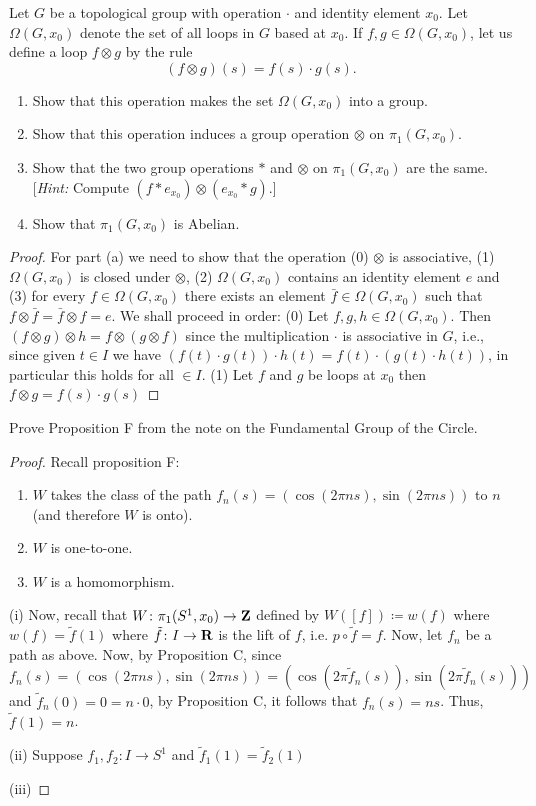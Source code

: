 \begin{problem}
Let $G$ be a topological group with operation $\cdot$ and identity element
$x_0$. Let $\Omega(G,x_0)$ denote the set of all loops in $G$ based at
$x_0$. If $f,g\in\Omega(G,x_0)$, let us define a loop $f\otimes g$ by the
rule
\[
(f\otimes g)(s)=f(s)\cdot g(s).
\]
\begin{enumerate}[label=(\alph*)]
\item Show that this operation makes the set $\Omega(G,x_0)$ into a group.
\item Show that this operation induces a group operation $\otimes$ on
  $\pi_1(G,x_0)$.
\item Show that the two group operations $*$ and $\otimes$ on
  $\pi_1(G,x_0)$ are the same. [\emph{Hint:} Compute
  $(f*e_{x_0})\otimes(e_{x_0}*g)$.]
\item Show that $\pi_1(G,x_0)$ is Abelian.
\end{enumerate}
\end{problem}
\begin{proof}
For part (a) we need to show that the operation (0) $\otimes$ is associative,
(1) $\Omega(G,x_0)$ is closed under $\otimes$, (2) $\Omega(G,x_0)$ contains
an identity element $e$ and (3) for every $f\in\Omega(G,x_0)$ there
exists an element $\bar f\in\Omega(G,x_0)$ such that $f\otimes\bar f=\bar
f\otimes f=e$. We shall proceed in order: (0) Let
$f,g,h\in\Omega(G,x_0)$. Then $(f\otimes g)\otimes h=f\otimes(g\otimes f)$
since the multiplication $\cdot$ is associative in $G$, i.e., since given
$t\in I$ we have $(f(t)\cdot g(t))\cdot h(t)=f(t)\cdot (g(t)\cdot h(t))$,
in particular this holds for all $\in I$. (1) Let $f$ and $g$ be loops at
$x_0$ then $f\otimes g=f(s)\cdot g(s)$
\end{proof}
\newpage
\begin{problem}[(A)]
Prove Proposition F from the note on the Fundamental Group of the
Circle.
\end{problem}
\begin{proof}
Recall proposition F:
\begin{proposition*}[F]
\begin{enumerate}[label={\normalfont(\roman*)}]
\item $W$ takes the class of the path $f_n(s)=(\cos(2\pi ns),\sin(2\pi
  ns))$ to $n$ (and therefore $W$ is onto).
\item $W$ is one-to-one.
\item $W$ is a homomorphism.
\end{enumerate}
\end{proposition*}
(i) Now, recall that $W\colon\pi_1(S^1,x_0)\to\mathbf{Z}$ defined by
$W([f])\coloneqq w(f)$ where $w(f)=\tilde f(1)$ where $\tilde f\colon
I\to\mathbf{R}$ is the lift of $f$, i.e. $p\circ \tilde f=f$. Now, let $f_n$ be a
path as above. Now, by Proposition C, since
\[
f_n(s)=(\cos(2\pi ns),\sin(2\pi ns))=(\cos(2\pi\tilde
f_n(s)),\sin(2\pi\tilde f_n(s)))
\]
and $\tilde f_n(0)=0=n\cdot 0$, by Proposition C, it follows that
$f_n(s)=ns$. Thus, $\tilde f(1)=n$.

(ii) Suppose $f_1,f_2\colon I\to S^1$ and $\tilde f_1(1)=\tilde f_2(1)$

(iii)
\end{proof}
